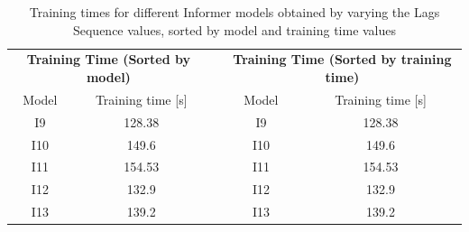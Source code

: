 \begin{table}[]
    \begin{tabular}{ccccc}
    \multicolumn{2}{c}{\textbf{Training   Time (Sorted by model)}} &  & \multicolumn{2}{c}{\textbf{Training Time (Sorted   by training time)}} \\
    Model             & Training time {[}s{]}                      &  & Model                 & Training time {[}s{]}                          \\
    I9                & \cellcolor[HTML]{63BE7B}128.38             &  & I9                    & \cellcolor[HTML]{63BE7B}128.38                 \\
    I10               & \cellcolor[HTML]{FB9374}149.6              &  & I10                   & \cellcolor[HTML]{FB9374}149.6                  \\
    I11               & \cellcolor[HTML]{F8696B}154.53             &  & I11                   & \cellcolor[HTML]{F8696B}154.53                 \\
    I12               & \cellcolor[HTML]{A4D07E}132.9              &  & I12                   & \cellcolor[HTML]{A4D07E}132.9                  \\
    I13               & \cellcolor[HTML]{FFEB84}139.2              &  & I13                   & \cellcolor[HTML]{FFEB84}139.2                 
    \end{tabular}
    \caption{Training times for different Informer models obtained  by varying the Lags Sequence values, sorted by model and training time values}
    \label{I2_T}
    \end{table}

